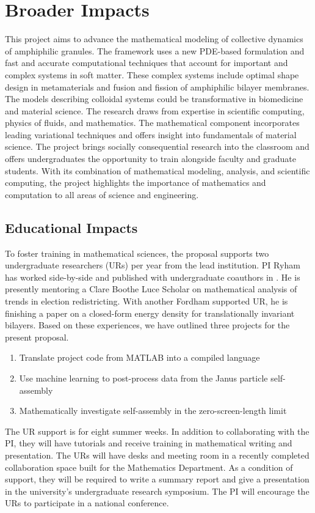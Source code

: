 \section{Broader Impacts}
\label{sec:BroaderImpacts}
This project aims to advance the mathematical modeling of collective
dynamics of amphiphilic granules. The framework uses a new PDE-based
formulation and fast and accurate computational techniques that account
for important and complex systems in
soft matter.  These complex systems include
optimal shape design in metamaterials and fusion and fission of amphiphilic
bilayer membranes. The models describing colloidal systems could be
transformative in biomedicine and material science.
The research draws from
expertise in scientific computing, physics of fluids, and mathematics. The
mathematical component incorporates leading variational techniques and offers
insight into fundamentals of material science. The project brings socially
consequential research into the classroom and offers 
undergraduates the opportunity to train alongside faculty and graduate students.
With its combination of mathematical modeling, analysis, and scientific computing,
the project highlights the importance of mathematics and computation to all areas
of science and engineering.


\subsection{Educational Impacts}
\label{subsec:Educational_plans}
To foster training in mathematical sciences,
the proposal supports two undergraduate researchers (URs) per year
from the lead institution.
PI Ryham has worked side-by-side and
published with undergraduate coauthors in
\cite{RYHAM20112929, RyWaCo13, RyKlYaCo16}.
He is presently mentoring a Clare Boothe Luce Scholar 
on mathematical analysis of trends in election redistricting.
With another Fordham supported UR,
he is finishing a paper on a closed-form 
energy density for translationally invariant bilayers. 
Based on these experiences, we have outlined three projects for the present proposal.
\begin{enumerate}[noitemsep,topsep=0pt]
\item Translate project code from MATLAB into a compiled language   

\item Use machine learning to post-process data from the Janus particle self-assembly

\item Mathematically investigate self-assembly in the zero-screen-length limit
  
\end{enumerate}
The UR support is for eight summer weeks. 
In addition to collaborating with the PI,
they will have tutorials and receive training in
mathematical writing and presentation.
The URs will have desks and meeting room
in a recently completed collaboration space
built for the Mathematics Department. 
As a condition of support, 
they will be required to write a summary report and
give a presentation in the university's undergraduate
research symposium.  The PI 
will encourage the
URs to participate in a national conference.

